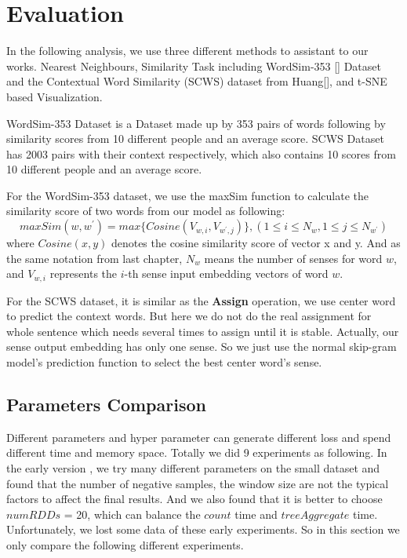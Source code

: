 \section{Evaluation}

In the following analysis, we use three different methods to assistant to our works. Nearest Neighbours, Similarity Task including WordSim-353 [] Dataset and the Contextual Word Similarity (SCWS) dataset from Huang[], and t-SNE based Visualization. 

WordSim-353 Dataset is a Dataset made up by 353 pairs of words following by similarity scores from 10 different people and an average score. SCWS Dataset has 2003 pairs with their context respectively, which also contains 10 scores from 10 different people and an average score. 

For the WordSim-353 dataset, we use the maxSim function to calculate the similarity score of two words from our model as following:
$$maxSim(w,w^\prime)=max\{Cosine(V_{w,i},V_{w^\prime,j})\}, (1\leq i\leq N_w, 1\leq j\leq N_{w^\prime} ) $$
where $Cosine(x, y)$ denotes the cosine similarity score of vector x and y. And as the same notation from last chapter, $N_w$ means the number of senses for word $w$, and $V_{w,i}$ represents the $i$-th sense input embedding vectors of word $w$. 

For the SCWS dataset, it is similar as the \textbf{Assign} operation, we use center word to predict the context words. But here we do not do the real assignment for whole sentence which needs several times to assign until it is stable. Actually, our sense output embedding has only one sense. So we just use the normal skip-gram model's prediction function to select the best center word's sense.
\subsection{Parameters Comparison}

Different parameters and hyper parameter can generate different loss and spend different time and memory space. Totally we did 9 experiments as following. In the early version , we try many different parameters on the small dataset and found that the number of negative samples, the window size are not the typical factors to affect the final results. And we also found that it is better to choose $numRDDs$ = 20, which can balance the $count$ time and $treeAggregate$ time. Unfortunately, we lost some data of these early experiments. So in this section we only compare the following different experiments. \\

